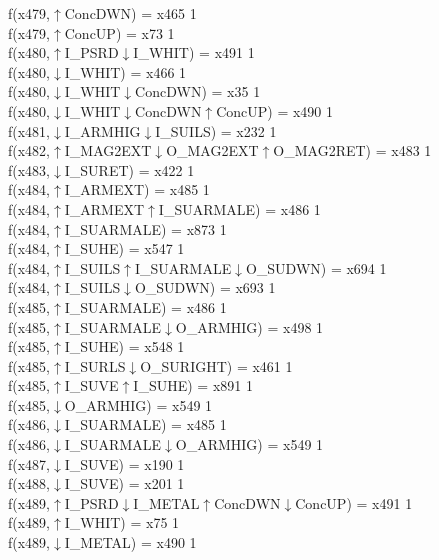 f(x479,$\uparrow$ConcDWN) = x465 {1} \\
f(x479,$\uparrow$ConcUP) = x73 {1} \\
f(x480,$\uparrow$I\_PSRD$\downarrow$I\_WHIT) = x491 {1} \\
f(x480,$\downarrow$I\_WHIT) = x466 {1} \\
f(x480,$\downarrow$I\_WHIT$\downarrow$ConcDWN) = x35 {1} \\
f(x480,$\downarrow$I\_WHIT$\downarrow$ConcDWN$\uparrow$ConcUP) = x490 {1} \\
f(x481,$\downarrow$I\_ARMHIG$\downarrow$I\_SUILS) = x232 {1} \\
f(x482,$\uparrow$I\_MAG2EXT$\downarrow$O\_MAG2EXT$\uparrow$O\_MAG2RET) = x483 {1} \\
f(x483,$\downarrow$I\_SURET) = x422 {1} \\
f(x484,$\uparrow$I\_ARMEXT) = x485 {1} \\
f(x484,$\uparrow$I\_ARMEXT$\uparrow$I\_SUARMALE) = x486 {1} \\
f(x484,$\uparrow$I\_SUARMALE) = x873 {1} \\
f(x484,$\uparrow$I\_SUHE) = x547 {1} \\
f(x484,$\uparrow$I\_SUILS$\uparrow$I\_SUARMALE$\downarrow$O\_SUDWN) = x694 {1} \\
f(x484,$\uparrow$I\_SUILS$\downarrow$O\_SUDWN) = x693 {1} \\
f(x485,$\uparrow$I\_SUARMALE) = x486 {1} \\
f(x485,$\uparrow$I\_SUARMALE$\downarrow$O\_ARMHIG) = x498 {1} \\
f(x485,$\uparrow$I\_SUHE) = x548 {1} \\
f(x485,$\uparrow$I\_SURLS$\downarrow$O\_SURIGHT) = x461 {1} \\
f(x485,$\uparrow$I\_SUVE$\uparrow$I\_SUHE) = x891 {1} \\
f(x485,$\downarrow$O\_ARMHIG) = x549 {1} \\
f(x486,$\downarrow$I\_SUARMALE) = x485 {1} \\
f(x486,$\downarrow$I\_SUARMALE$\downarrow$O\_ARMHIG) = x549 {1} \\
f(x487,$\downarrow$I\_SUVE) = x190 {1} \\
f(x488,$\downarrow$I\_SUVE) = x201 {1} \\
f(x489,$\uparrow$I\_PSRD$\downarrow$I\_METAL$\uparrow$ConcDWN$\downarrow$ConcUP) = x491 {1} \\
f(x489,$\uparrow$I\_WHIT) = x75 {1} \\
f(x489,$\downarrow$I\_METAL) = x490 {1} \\
